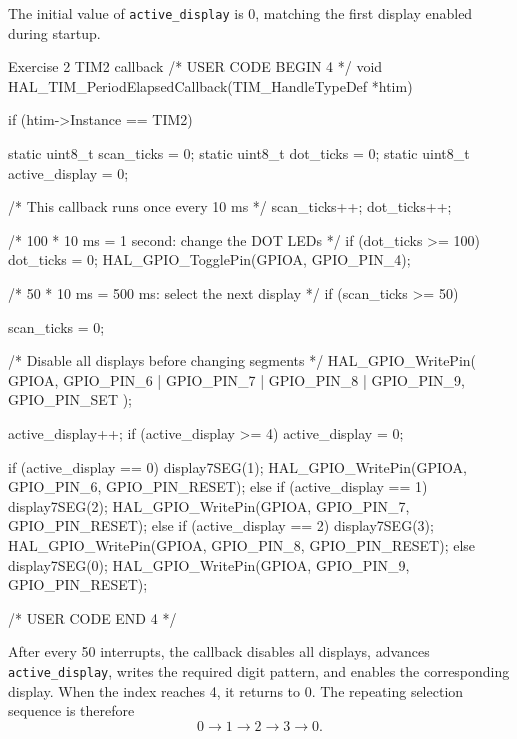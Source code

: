 \documentclass[a4paper]{article}
\begin{document}
The initial value of \texttt{active\_display} is 0,
matching the first display enabled during startup.

\begin{stmcode}{Exercise 2 TIM2 callback}
/* USER CODE BEGIN 4 */
void HAL_TIM_PeriodElapsedCallback(TIM_HandleTypeDef *htim)
{
    if (htim->Instance == TIM2)
    {
        static uint8_t scan_ticks = 0;
        static uint8_t dot_ticks = 0;
        static uint8_t active_display = 0;

        /* This callback runs once every 10 ms */
        scan_ticks++;
        dot_ticks++;

        /* 100 * 10 ms = 1 second: change the DOT LEDs */
        if (dot_ticks >= 100)
        {
            dot_ticks = 0;
            HAL_GPIO_TogglePin(GPIOA, GPIO_PIN_4);
        }

        /* 50 * 10 ms = 500 ms: select the next display */
        if (scan_ticks >= 50)
        {
            scan_ticks = 0;

            /* Disable all displays before changing segments */
            HAL_GPIO_WritePin(
                GPIOA,
                GPIO_PIN_6 | GPIO_PIN_7 | GPIO_PIN_8 | GPIO_PIN_9,
                GPIO_PIN_SET
            );

            active_display++;
            if (active_display >= 4)
            {
                active_display = 0;
            }

            if (active_display == 0)
            {
                display7SEG(1);
                HAL_GPIO_WritePin(GPIOA, GPIO_PIN_6, GPIO_PIN_RESET);
            }
            else if (active_display == 1)
            {
                display7SEG(2);
                HAL_GPIO_WritePin(GPIOA, GPIO_PIN_7, GPIO_PIN_RESET);
            }
            else if (active_display == 2)
            {
                display7SEG(3);
                HAL_GPIO_WritePin(GPIOA, GPIO_PIN_8, GPIO_PIN_RESET);
            }
            else
            {
                display7SEG(0);
                HAL_GPIO_WritePin(GPIOA, GPIO_PIN_9, GPIO_PIN_RESET);
            }
        }
    }
}
/* USER CODE END 4 */
\end{stmcode}

After every 50 interrupts, the callback disables
all displays, advances \texttt{active\_display},
writes the required digit pattern, and enables
the corresponding display. When the index reaches
4, it returns to 0. The repeating selection
sequence is therefore
\[
    0 \rightarrow 1 \rightarrow 2 \rightarrow 3
    \rightarrow 0.
\]
\end{document}
